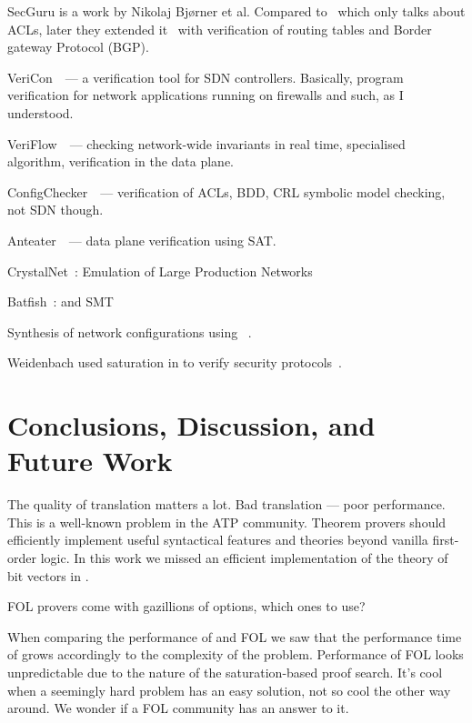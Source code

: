 SecGuru is a work by Nikolaj Bj\o{}rner et al. Compared to~\cite{jayaraman2014automated} which only talks about ACLs, later they extended it~\cite{DBLP:conf/icdcit/BjornerJ15} with verification of routing tables and Border gateway Protocol (BGP). 

VeriCon~\cite{DBLP:conf/pldi/BallBGIKSSV14}~--- a verification tool for SDN controllers. Basically, program verification for network applications running on firewalls and such, as I understood.

VeriFlow~\cite{Veriflow}~--- checking network-wide invariants in real time, specialised algorithm, verification in the data plane.

ConfigChecker~\cite{ConfigChecker}~--- verification of ACLs, BDD, CRL symbolic model checking, not SDN though.

Anteater~\cite{Anteater}~--- data plane verification using SAT.

CrystalNet~\cite{crystalnet}: Emulation of Large Production Networks

Batfish~\cite{batfish}: \Datalog and SMT

Synthesis of network configurations using \Datalog~\cite{DBLP:conf/cav/El-HassanyTVV17}.

Weidenbach used saturation in \spass to verify security protocols~\cite{Weidenbach99}.

\section{Conclusions, Discussion, and Future Work}
\label{sect:aws/conclusion}
The quality of translation matters a lot. Bad translation --- poor performance. This is a well-known problem in the ATP community. Theorem provers should efficiently implement useful syntactical features and theories beyond vanilla first-order logic. In this work we missed an efficient implementation of the theory of bit vectors in \vampire.

FOL provers come with gazillions of options, which ones to use?

When comparing the performance of \Datalog and FOL we saw that the performance time of \Datalog grows accordingly to the complexity of the problem. Performance of FOL looks unpredictable due to the nature of the saturation-based proof search. It's cool when a seemingly hard problem has an easy solution, not so cool the other way around. We wonder if a FOL community has an answer to it.

